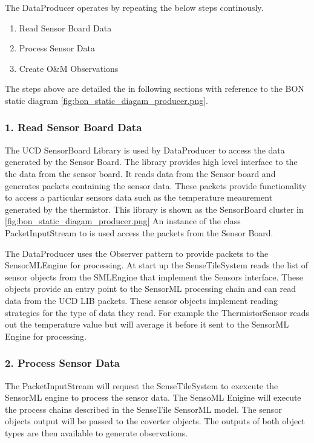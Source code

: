 \documentclass[]{final_report}
\begin{document}
The DataProducer operates by repeating the below steps continously.
 \begin{enumerate}
\item Read Sensor Board Data
\item Process Sensor Data
\item Create O\&M Observations
\end{enumerate}
The steps above are detailed the in following sections with reference
to the BON static diagram \ref{fig:bon_static_diagam_producer.png}.

\subsubsection {1. Read Sensor Board Data}

The UCD SensorBoard Library is used by DataProducer to access
the data generated by the Sensor Board.
The library provides high level interface to the
the data from the sensor board. It reads data from the Sensor board and generates packets
containing the sensor data. These packets provide functionality
to access a particular sensors data such as the temperature
meaurement generated by the thermistor. 
This library is shown as the SensorBoard cluster in \ref{fig:bon_static_diagam_producer.png}
An instance of the class PacketInputStream to is used access the packets from the Sensor Board.

The DataProducer uses the Observer pattern to provide
packets to the SensorMLEngine for processing.
At start up the SenseTileSystem reads the list of sensor objects from the SMLEngine that
implement the Sensors interface. These objects provide an entry point
to the SensorML processing chain and can read data from the UCD LIB packets.
These sensor objects implement reading strategies for the type of data they read. 
For example the ThermistorSensor reads out the temperature value
but will average it before it sent to the SensorML Engine for processing.

\subsubsection {2. Process Sensor Data}
The PacketInputStream will request the SenseTileSystem to exexcute
the SensorML engine to process the sensor data. The SensoML Enigine
will execute the process chains described in the SenseTile SensorML model.
The sensor objects output will be passed to the coverter objects. The
outputs of both object types are then available to generate observations.
\end{document}

